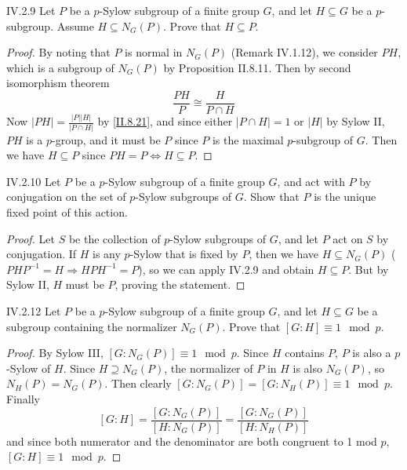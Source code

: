\begin{problem}{IV.2.9}
Let $P$ be a $p$-Sylow subgroup of a finite group $G$, and let $H \subseteq G$ be a $p$-subgroup. Assume $H \subseteq N_G(P)$. Prove that $H \subseteq P$.
\end{problem}
\begin{proof}
By noting that $P$ is normal in $N_G(P)$ (Remark IV.1.12), we consider $PH$, which is a subgroup of $N_G(P)$ by Proposition II.8.11. Then by second isomorphism theorem
\[
\frac{PH}{P} \cong \frac{H}{P \cap H}	
\]
Now $|PH| = \frac{|P||H|}{|P \cap H|}$ by \ref{II.8.21}, and since either $|P \cap H| = 1$ or $|H|$ by Sylow II, $PH$ is a $p$-group, and it must be $P$ since $P$ is the maximal $p$-subgroup of $G$. Then we have $H \subseteq P$ since $PH = P \Leftrightarrow H \subseteq P$.
\end{proof}



\begin{problem}{IV.2.10}
Let $P$ be a $p$-Sylow subgroup of a finite group $G$, and act with $P$ by conjugation on the set of $p$-Sylow subgroups of $G$. Show that $P$ is the unique fixed point of this action.
\end{problem}
\begin{proof}
Let $S$ be the collection of $p$-Sylow subgroups of $G$, and let $P$ act on $S$ by conjugation. If $H$ is any $p$-Sylow that is fixed by $P$, then we have $H \subseteq N_G(P)$ ($PHP^{-1} = H \Rightarrow HPH^{-1} = P$), so we can apply IV.2.9 and obtain $H \subseteq P$. But by Sylow II, $H$ must be $P$, proving the statement. 
\end{proof}

\begin{problem}{IV.2.12}
Let $P$ be a $p$-Sylow subgroup of a finite group $G$, and let $H \subseteq G$ be a subgroup containing the normalizer $N_G(P)$. Prove that $[G:H] \equiv 1 \mod p$.
\end{problem}
\begin{proof}
By Sylow III, $[G : N_G(P)] \equiv 1 \mod p $. Since $H$ contains $P$, $P$ is also a $p$-Sylow of $H$. Since $H \supseteq N_G(P)$, the normalizer of $P$ in $H$ is also $N_G(P)$, so $N_H(P) = N_G(P)$. Then clearly $[G : N_G(P)] = [G : N_H(P)] \equiv 1 \mod p$. Finally
\[
[G : H] = \frac{[G : N_G(P)]}{[H : N_G(P)]}	= \frac{[G : N_G(P)]}{[H : N_H(P)]}
\]
and since both numerator and the denominator are both congruent to 1 mod $p$, $[G:H] \equiv 1 \mod p$.
\end{proof}

